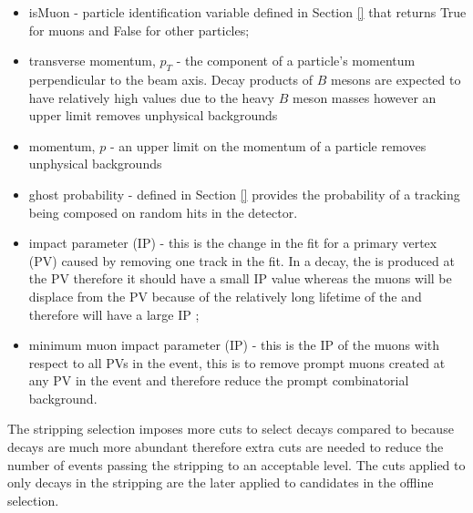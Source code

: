\begin{itemize}
\item isMuon - particle identification variable defined in Section \ref{} that returns True for muons and False for other particles;
\item transverse momentum, $p_{T}$ - the component of a particle's momentum perpendicular to the beam axis. Decay products of $B$ mesons are expected to have relatively high \pt values due to the heavy $B$ meson masses however an upper limit removes unphysical backgrounds
\item momentum, $p$ - an upper limit on the momentum of a particle  removes unphysical backgrounds
\item ghost probability - defined in Section \ref{} provides the probability of a tracking being composed on random hits in the detector.
\item impact parameter (IP) \chisqd $ $- this is the change in the fit for a primary vertex (PV) caused by removing one track in the fit. In a \bsmumu decay, the \bs is produced at the PV therefore it should have a small IP \chisqd value whereas the muons will be displace from the PV because of the relatively long lifetime of the \bs and therefore will have a large IP \chisqd;
\item minimum muon impact parameter (IP) \chisqd $ $- this is the IP \chisqd of the muons with respect to all PVs in the event, this is to remove prompt muons created at any PV in the event and therefore reduce the prompt combinatorial background. 
\end{itemize}

The stripping selection imposes more cuts to select \bhh decays compared to \bsmumu because \bhh decays are much more abundant therefore extra cuts are needed to reduce the number of events passing the stripping to an acceptable level. The cuts applied to only \bhh decays in the stripping are the later applied to \bsmumu candidates in the offline selection. 

